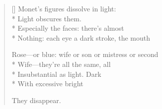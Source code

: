 \label{ch:print_over_the_sink}
\settowidth{\versewidth}{Rose—or blue: wife or son or mistress or second}
\begin{verse}[\versewidth]
Monet's figures dissolve in light:\\*
Light obscures them.\\*
Especially the faces: there's almost\\*
Nothing: each eye a dark stroke, the mouth

Rose---or blue: wife or son or mistress or second\\*
Wife---they're all the same, all\\*
Insubstantial as light.    Dark\\*
With excessive bright

They disappear.
\end{verse}
